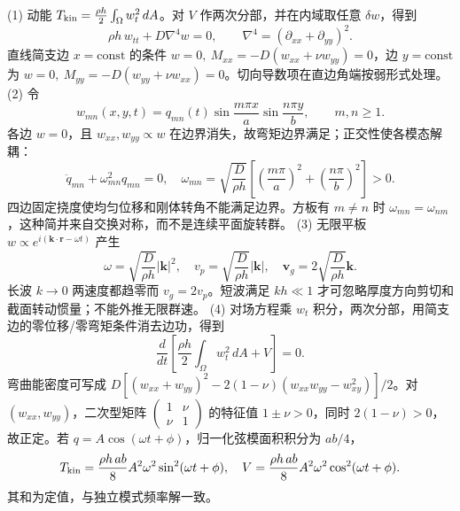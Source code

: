 (1) 动能 \(T_{\rm kin}=\frac{\rho h}{2}\int_\Omega w_t^2\,dA\)。对 \(V\) 作两次分部，并在内域取任意 \(\delta w\)，得到
\[
\rho h\,w_{tt}+D\nabla^4w=0,\qquad
\nabla^4=(\partial_{xx}+\partial_{yy})^2.
\]
直线简支边 \(x=\mathrm{const}\) 的条件 \(w=0,\ M_{xx}=-D(w_{xx}+\nu w_{yy})=0\)，边 \(y=\mathrm{const}\) 为 \(w=0,\ M_{yy}=-D(w_{yy}+\nu w_{xx})=0\)。切向导数项在直边角端按弱形式处理。
(2) 令
\[
w_{mn}(x,y,t)=q_{mn}(t)\sin\frac{m\pi x}a\sin\frac{n\pi y}b,\qquad m,n\ge1.
\]
各边 \(w=0\)，且 \(w_{xx},w_{yy}\propto w\) 在边界消失，故弯矩边界满足；正交性使各模态解耦：
\[
\ddot q_{mn}+\omega_{mn}^2q_{mn}=0,\quad
\omega_{mn}=\sqrt{\frac D{\rho h}}\left[\left(\frac{m\pi}a\right)^2+\left(\frac{n\pi}b\right)^2\right]>0.
\]
四边固定挠度使均匀位移和刚体转角不能满足边界。方板有 \(m\ne n\) 时 \(\omega_{mn}=\omega_{nm}\)，这种简并来自交换对称，而不是连续平面旋转群。
(3) 无限平板 \(w\propto e^{i(\boldsymbol k\cdot\boldsymbol r-\omega t)}\) 产生
\[
\omega=\sqrt{\frac D{\rho h}}|\boldsymbol k|^2,\quad
v_p=\sqrt{\frac D{\rho h}}|\boldsymbol k|,\quad
\boldsymbol v_g=2\sqrt{\frac D{\rho h}}\boldsymbol k.
\]
长波 \(k\to0\) 两速度都趋零而 \(v_g=2v_p\)。短波满足 \(kh\ll1\) 才可忽略厚度方向剪切和截面转动惯量；不能外推无限群速。
(4) 对场方程乘 \(w_t\) 积分，两次分部，用简支边的零位移/零弯矩条件消去边功，得到
\[
\frac d{dt}\left[
\frac{\rho h}2\int_\Omega w_t^2\,dA+V
\right]=0.
\]
弯曲能密度可写成 \(D[(w_{xx}+w_{yy})^2-2(1-\nu)(w_{xx}w_{yy}-w_{xy}^2)]/2\)。对 \((w_{xx},w_{yy})\)，二次型矩阵 \(\begin{pmatrix}1&\nu\\\nu&1\end{pmatrix}\) 的特征值 \(1\pm\nu>0\)，同时 \(2(1-\nu)>0\)，故正定。若 \(q=A\cos(\omega t+\phi)\)，归一化弦模面积积分为 \(ab/4\)，
\[
T_{\rm kin}=\frac{\rho h\,ab}{8}A^2\omega^2\sin^2(\omega t+\phi),\quad
V=\frac{\rho h\,ab}{8}A^2\omega^2\cos^2(\omega t+\phi).
\]
其和为定值，与独立模式频率解一致。
